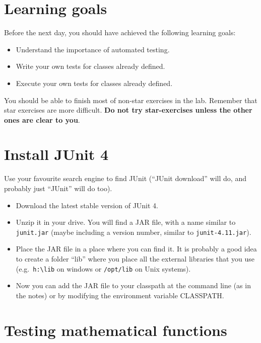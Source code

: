 \documentclass{article}
\begin{document}
\section*{Learning goals}
\label{sec:learning-goals}

Before the next day, you should have achieved the following learning
goals: 

\begin{itemize}
\item Understand the importance of automated testing. 
\item Write your own tests for classes already defined. 
\item Execute your own tests for classes already defined. 
\end{itemize}

You should be able to finish most of non-star exercises in the lab. 
Remember that star exercises are more difficult. 
\textbf{Do not try star-exercises unless the other ones are clear to
  you}.  


\section{Install JUnit 4}
\label{sec:install-junit-4}

Use your favourite search engine to find JUnit (``JUnit download''
will do, and probably just ``JUnit'' will do too). 

\begin{itemize}
\item Download the latest stable version of JUnit 4.
\item Unzip it in your drive. You will find a JAR file, with a name
  similar to \verb+junit.jar+ (maybe including a version number,
  similar to \verb+junit-4.11.jar+).
\item Place the JAR file in a place where you can find it. It is
  probably a good idea to create a folder ``lib'' where you place all
  the external libraries that you use (e.g.~\verb+h:\lib+ on windows
  or \verb+/opt/lib+ on Unix systems).
\item Now you can add the JAR file to your classpath at the command
  line (as in the notes) or by modifying the environment variable
  CLASSPATH. 
\end{itemize}

\section{Testing mathematical functions}
\label{sec:test-math-funct}
\end{document}
